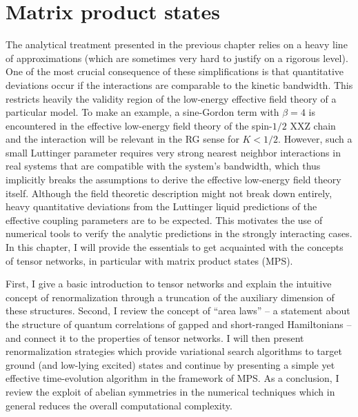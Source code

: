 %
%
\chapter{Matrix product states}
\label{sec:matrix_product_states}
%
%
The analytical treatment presented in the previous chapter relies on a heavy line of approximations (which are sometimes very hard to justify on a rigorous level).
One of the most crucial consequence of these simplifications is that quantitative deviations occur if the interactions are comparable to the kinetic bandwidth.
This restricts heavily the validity region of the low-energy effective field theory of a particular model.
To make an example, a sine-Gordon term with $\beta=4$ is encountered in the effective low-energy field theory of the spin-$1/2$ XXZ chain and the interaction will be relevant in the RG sense for $K<1/2$.
However, such a small Luttinger parameter requires very strong nearest neighbor interactions in real systems that are compatible with the system's bandwidth, which thus implicitly breaks the assumptions to derive the effective low-energy field theory itself.
Although the field theoretic description might not break down entirely, heavy quantitative deviations from the Luttinger liquid predictions of the effective coupling parameters are to be expected.
This motivates the use of numerical tools to verify the analytic predictions in the strongly interacting cases.
In this chapter, I will provide the essentials to get acquainted with the concepts of tensor networks, in particular with matrix product states (MPS).

First, I give a basic introduction to tensor networks and explain the intuitive concept of renormalization through a truncation of the auxiliary dimension of these structures.
Second, I review the concept of ``area laws'' -- a statement about the structure of quantum correlations of gapped and short-ranged Hamiltonians -- and connect it to the properties of tensor networks.
I will then present renormalization strategies which provide variational search algorithms to target ground (and low-lying excited) states and continue by presenting a simple yet effective time-evolution algorithm in the framework of MPS.
As a conclusion, I review the exploit of abelian symmetries in the numerical techniques which in general reduces the overall computational complexity.
%
%
